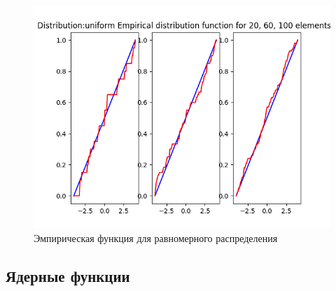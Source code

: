 \documentclass[12pt]{report}
\begin{document}
\begin{center}
\begin{figure}[H]
 \caption{Эмпирическая функция для равномерного распределения }
\includegraphics[width=\textwidth]{../lab_4/pic/empiric/uniform.png}
\end{figure}
\end{center}
\subsection{Ядерные функции}
\end{document}

